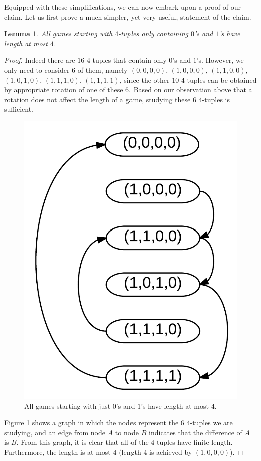 \documentclass[12pt]{amsart}
\newtheorem{lemma}[theorem]{Lemma}
\begin{document}
Equipped with these simplifications, we can now embark upon a proof of our claim. Let us first prove a much simpler, yet very useful, statement of the claim.

\begin{lemma}
All games starting with $4$-tuples only containing $0$'s and $1$'s have length at most $4$.
\label{lem:zerosones}
\end{lemma}

\begin{proof}
Indeed there are $16$ $4$-tuples that contain only $0$'s and $1$'s. However, we only need to consider $6$ of them, namely $(0,0,0,0)$, $(1,0,0,0)$, $(1,1,0,0)$, $(1,0,1,0)$, $(1,1,1,0)$, $(1,1,1,1)$, since the other $10$ $4$-tuples can be obtained by appropriate rotation of one of these $6$. Based on our observation above that a rotation does not affect the length of a game, studying these $6$ $4$-tuples is sufficient.

\begin{figure}
\includegraphics{number_squares_0s_and_1s.png}
\caption{All games starting with just $0$'s and $1$'s have length at most $4$.}
\label{fig:zerosones}
\end{figure}

Figure \ref{fig:zerosones} shows a graph in which the nodes represent the $6$ $4$-tuples we are studying, and an edge from node $A$ to node $B$ indicates that the difference of $A$ is $B$. From this graph, it is clear that all of the $4$-tuples have finite length. Furthermore, the length is at most $4$ (length $4$ is achieved by $(1,0,0,0)$).

\end{proof}
\end{document}
